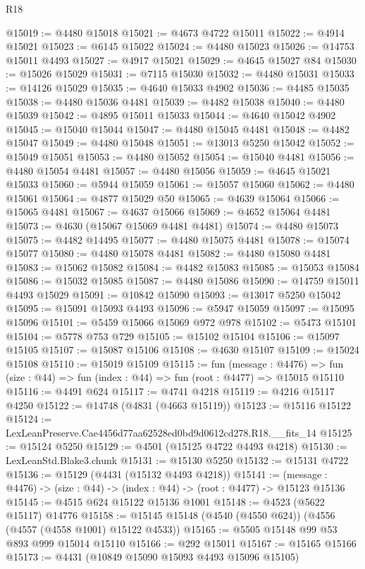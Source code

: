 \begin{lexlean}{R18}
\begin{coremodule}
@15019 := @4480 @15018
@15021 := @4673 @4722 @15011
@15022 := @4914 @15021
@15023 := @6145 @15022
@15024 := @4480 @15023
@15026 := @14753 @15011 @4493
@15027 := @4917 @15021
@15029 := @4645 @15027 @84
@15030 := @15026 @15029
@15031 := @7115 @15030
@15032 := @4480 @15031
@15033 := @14126 @15029
@15035 := @4640 @15033 @4902
@15036 := @4485 @15035
@15038 := @4480 @15036 @4481
@15039 := @4482 @15038
@15040 := @4480 @15039
@15042 := @4895 @15011 @15033
@15044 := @4640 @15042 @4902
@15045 := @15040 @15044
@15047 := @4480 @15045 @4481
@15048 := @4482 @15047
@15049 := @4480 @15048
@15051 := @13013 @5250 @15042
@15052 := @15049 @15051
@15053 := @4480 @15052
@15054 := @15040 @4481
@15056 := @4480 @15054 @4481
@15057 := @4480 @15056
@15059 := @4645 @15021 @15033
@15060 := @5944 @15059
@15061 := @15057 @15060
@15062 := @4480 @15061
@15064 := @4877 @15029 @50
@15065 := @4639 @15064
@15066 := @15065 @4481
@15067 := @4637 @15066
@15069 := @4652 @15064 @4481
@15073 := @4630 (@15067 @15069 @4481 @4481)
@15074 := @4480 @15073
@15075 := @4482 @14495
@15077 := @4480 @15075 @4481
@15078 := @15074 @15077
@15080 := @4480 @15078 @4481
@15082 := @4480 @15080 @4481
@15083 := @15062 @15082
@15084 := @4482 @15083
@15085 := @15053 @15084
@15086 := @15032 @15085
@15087 := @4480 @15086
@15090 := @14759 @15011 @4493 @15029
@15091 := @10842 @15090
@15093 := @13017 @5250 @15042
@15095 := @15091 @15093 @4493
@15096 := @5947 @15059
@15097 := @15095 @15096
@15101 := @5459 @15066 @15069 @972 @978
@15102 := @5473 @15101
@15104 := @5778 @753 @729
@15105 := @15102 @15104
@15106 := @15097 @15105
@15107 := @15087 @15106
@15108 := @4630 @15107
@15109 := @15024 @15108
@15110 := @15019 @15109
@15115 := fun (message : @4476) =>
  fun (size : @44) => fun (index : @44) => fun (root : @4477) => @15015 @15110
@15116 := @4491 @624
@15117 := @4741 @4218
@15119 := @4216 @15117 @4250
@15122 := @14748 (@4831 (@4663 @15119))
@15123 := @15116 @15122
@15124 := LexLeanPreserve.Cae4456d77aa62528ed0bd9d0612cd278.R18.__fits_14
@15125 := @15124 @5250
@15129 := @4501 (@15125 @4722 @4493 @4218)
@15130 := LexLeanStd.Blake3.chunk
@15131 := @15130 @5250
@15132 := @15131 @4722
@15136 := @15129 (@4431 (@15132 @4493 @4218))
@15141 := (message : @4476) -> (size : @44) -> (index : @44) -> (root : @4477) -> @15123 @15136
@15145 := @4515 @624 @15122 @15136 @1001
@15148 := @4523 (@5622 @15117) @14776
@15158 := @15145 @15148 (@4540 (@4550 @624)) (@4556 (@4557 (@4558 @1001) @15122 @4533))
@15165 := @5505 @15148 @99 @53 @893 @999 @15014 @15110
@15166 := @292 @15011
@15167 := @15165 @15166
@15173 := @4431 (@10849 @15090 @15093 @4493 @15096 @15105)

\end{coremodule}
\end{lexlean}
